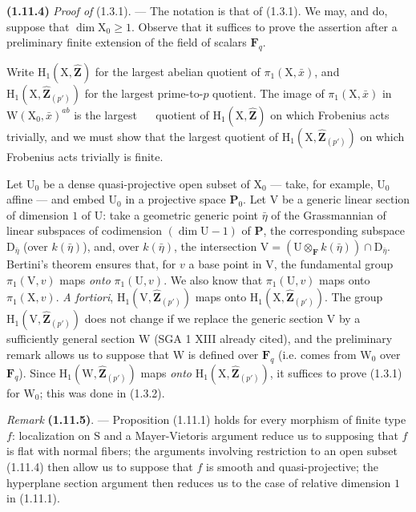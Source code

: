 \documentclass[11pt,leqno]{article}
\newcommand{\Page}[1]{\ifvmode\noindent\else\unskip\ \fi{\footnotesize\textcolor{gray}{[p.\,#1]}}\ \ignorespaces}
\begin{document}
\textbf{(1.11.4)} \textit{Proof of} (1.3.1). — The notation is that of (1.3.1). We may, and do, suppose that \(\dim\mathrm{X}_0\geq1\). Observe that it suffices to prove the assertion after a preliminary finite extension of the field of scalars \(\mathbf{F}_q\).

Write \(\mathrm{H}_1(\mathrm{X},\widehat{\mathbf{Z}})\) for the largest abelian quotient of \(\pi_1(\mathrm{X},\bar{x})\), and \(\mathrm{H}_1(\mathrm{X},\widehat{\mathbf{Z}}_{(p')})\) for the largest prime-to-\(p\) quotient. The image of \(\pi_1(\mathrm{X},\bar{x})\) in \(\mathrm{W}(\mathrm{X}_0,\bar{x})^{ab}\) is the largest
\Page{186}
quotient of \(\mathrm{H}_1(\mathrm{X},\widehat{\mathbf{Z}})\) on which Frobenius acts trivially, and we must show that the largest quotient of \(\mathrm{H}_1(\mathrm{X},\widehat{\mathbf{Z}}_{(p')})\) on which Frobenius acts trivially is finite.

Let \(\mathrm{U}_0\) be a dense quasi-projective open subset of \(\mathrm{X}_0\) — take, for example, \(\mathrm{U}_0\) affine — and embed \(\mathrm{U}_0\) in a projective space \(\mathbf{P}_0\). Let \(\mathrm{V}\) be a generic linear section of dimension \(1\) of \(\mathrm{U}\): take a geometric generic point \(\bar{\eta}\) of the Grassmannian of linear subspaces of codimension \((\dim\mathrm{U}-1)\) of \(\mathbf{P}\), the corresponding subspace \(\mathrm{D}_{\bar{\eta}}\) (over \(k(\bar{\eta})\)), and, over \(k(\bar{\eta})\), the intersection \(\mathrm{V}=(\mathrm{U}\otimes_{\mathbf{F}}k(\bar{\eta}))\cap\mathrm{D}_{\bar{\eta}}\). Bertini's theorem ensures that, for \(v\) a base point in \(\mathrm{V}\), the fundamental group \(\pi_1(\mathrm{V},v)\) maps \textit{onto} \(\pi_1(\mathrm{U},v)\). We also know that \(\pi_1(\mathrm{U},v)\) maps onto \(\pi_1(\mathrm{X},v)\). \textit{A fortiori}, \(\mathrm{H}_1(\mathrm{V},\widehat{\mathbf{Z}}_{(p')})\) maps onto \(\mathrm{H}_1(\mathrm{X},\widehat{\mathbf{Z}}_{(p')})\). The group \(\mathrm{H}_1(\mathrm{V},\widehat{\mathbf{Z}}_{(p')})\) does not change if we replace the generic section \(\mathrm{V}\) by a sufficiently general section \(\mathrm{W}\) (SGA 1 XIII already cited), and the preliminary remark allows us to suppose that \(\mathrm{W}\) is defined over \(\mathbf{F}_q\) (i.e. comes from \(\mathrm{W}_0\) over \(\mathbf{F}_q\)). Since \(\mathrm{H}_1(\mathrm{W},\widehat{\mathbf{Z}}_{(p')})\) maps \textit{onto} \(\mathrm{H}_1(\mathrm{X},\widehat{\mathbf{Z}}_{(p')})\), it suffices to prove (1.3.1) for \(\mathrm{W}_0\); this was done in (1.3.2).

\textit{Remark} \textbf{(1.11.5)}. — Proposition (1.11.1) holds for every morphism of finite type \(f\): localization on \(\mathrm{S}\) and a Mayer-Vietoris argument reduce us to supposing that \(f\) is flat with normal fibers; the arguments involving restriction to an open subset (1.11.4) then allow us to suppose that \(f\) is smooth and quasi-projective; the hyperplane section argument then reduces us to the case of relative dimension \(1\) in (1.11.1).
\end{document}
